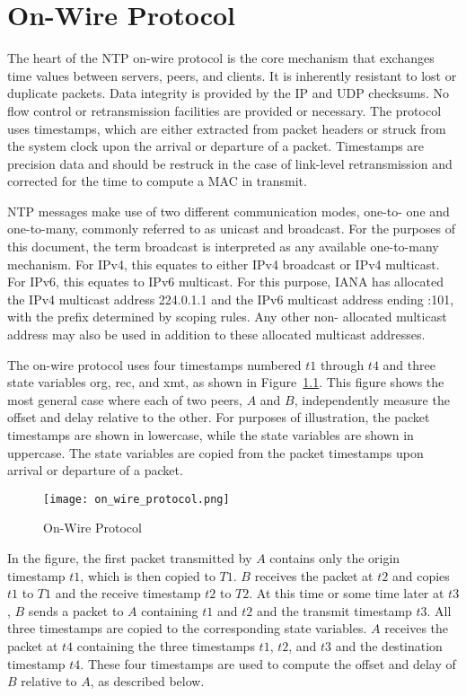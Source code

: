 \chapter{On-Wire Protocol}
\label{section-8}

The heart of the NTP on-wire protocol is the core mechanism that
exchanges time values between servers, peers, and clients. It is
inherently resistant to lost or duplicate packets. Data integrity is
provided by the IP and UDP checksums. No flow control or
retransmission facilities are provided or necessary. The protocol
uses timestamps, which are either extracted from packet headers or
struck from the system clock upon the arrival or departure of a
packet. Timestamps are precision data and should be restruck in the
case of link-level retransmission and corrected for the time to
compute a MAC in transmit.

NTP messages make use of two different communication modes, one-to-
one and one-to-many, commonly referred to as unicast and broadcast.
For the purposes of this document, the term broadcast is interpreted
as any available one-to-many mechanism. For IPv4, this equates to
either IPv4 broadcast or IPv4 multicast. For IPv6, this equates to
IPv6 multicast. For this purpose, IANA has allocated the IPv4
multicast address 224.0.1.1 and the IPv6 multicast address ending
:101, with the prefix determined by scoping rules. Any other non-
allocated multicast address may also be used in addition to these
allocated multicast addresses.

The on-wire protocol uses four timestamps numbered $ t1 $ through $ t4 $ and
three state variables org, rec, and xmt, as shown in Figure~\ref{on_wire_protocol}. This
figure shows the most general case where each of two peers, $ A $ and $ B $,
independently measure the offset and delay relative to the other.
For purposes of illustration, the packet timestamps are shown in
lowercase, while the state variables are shown in uppercase. The
state variables are copied from the packet timestamps upon arrival or
departure of a packet.

\begin{figure}
\centering
\texttt{[image: on\_wire\_protocol.png]}
\caption{On-Wire Protocol}
\label{on_wire_protocol}
\end{figure}

In the figure, the first packet transmitted by $ A $ contains only the
origin timestamp $ t1 $, which is then copied to $ T1 $. $ B $ receives the
packet at $ t2 $ and copies $ t1 $ to $ T1 $ and the receive timestamp $ t2 $ to $ T2 $.
At this time or some time later at $ t3 $, $ B $ sends a packet to $ A $
containing $ t1 $ and $ t2 $ and the transmit timestamp $ t3 $. All three
timestamps are copied to the corresponding state variables. $ A $
receives the packet at $ t4 $ containing the three timestamps $ t1 $, $ t2 $, and
$ t3 $ and the destination timestamp $ t4 $. These four timestamps are used
to compute the offset and delay of $ B $ relative to $ A $, as described
below.

